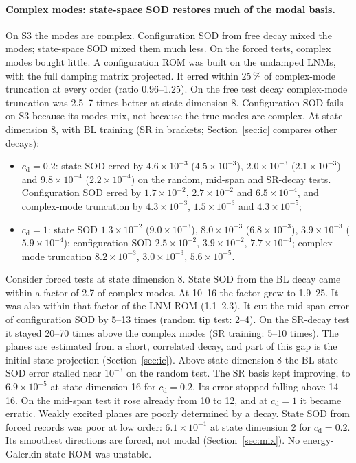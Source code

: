 \documentclass[11pt]{article}
\begin{document}
\paragraph{Complex modes: state-space SOD restores much of the modal basis.} On S3 the modes are complex. Configuration SOD from free decay mixed the modes; state-space SOD mixed them much less.
On the forced tests, complex modes bought little. A configuration ROM was built on the undamped LNMs, with the full damping matrix projected. It erred within 25\,\% of complex-mode truncation at every order (ratio 0.96--1.25). On the free test decay complex-mode truncation was 2.5--7 times better at state dimension 8. Configuration SOD fails on S3 because its modes mix, not because the true modes are complex.
At state dimension 8, with BL training (SR in brackets; Section~\ref{sec:ic} compares other decays):
\begin{itemize}
\item $c_{\mathrm d}=0.2$: state SOD erred by $4.6\times10^{-3}$ ($4.5\times10^{-3}$), $2.0\times10^{-3}$ ($2.1\times10^{-3}$) and $9.8\times10^{-4}$ ($2.2\times10^{-4}$) on the random, mid-span and SR-decay tests. Configuration SOD erred by $1.7\times10^{-2}$, $2.7\times10^{-2}$ and $6.5\times10^{-4}$, and complex-mode truncation by $4.3\times10^{-3}$, $1.5\times10^{-3}$ and $4.3\times10^{-5}$;
\item $c_{\mathrm d}=1$: state SOD $1.3\times10^{-2}$ ($9.0\times10^{-3}$), $8.0\times10^{-3}$ ($6.8\times10^{-3}$), $3.9\times10^{-3}$ ($5.9\times10^{-4}$); configuration SOD $2.5\times10^{-2}$, $3.9\times10^{-2}$, $7.7\times10^{-4}$; complex-mode truncation $8.2\times10^{-3}$, $3.0\times10^{-3}$, $5.6\times10^{-5}$.
\end{itemize}
Consider forced tests at state dimension 8. State SOD from the BL decay came within a factor of 2.7 of complex modes. At 10--16 the factor grew to 1.9--25. It was also within that factor of the LNM ROM (1.1--2.3). It cut the mid-span error of configuration SOD by 5--13 times (random tip test: 2--4). On the SR-decay test it stayed 20--70 times above the complex modes (SR training: 5--10 times). The planes are estimated from a short, correlated decay, and part of this gap is the initial-state projection (Section~\ref{sec:ic}).
Above state dimension 8 the BL state SOD error stalled near $10^{-3}$ on the random test. The SR basis kept improving, to $6.9\times10^{-5}$ at state dimension 16 for $c_{\mathrm d}=0.2$. Its error stopped falling above 14--16. On the mid-span test it rose already from 10 to 12, and at $c_{\mathrm d}=1$ it became erratic. Weakly excited planes are poorly determined by a decay.
State SOD from forced records was poor at low order: $6.1\times10^{-1}$ at state dimension 2 for $c_{\mathrm d}=0.2$. Its smoothest directions are forced, not modal (Section~\ref{sec:mix}).
No energy-Galerkin state ROM was unstable.
\end{document}
